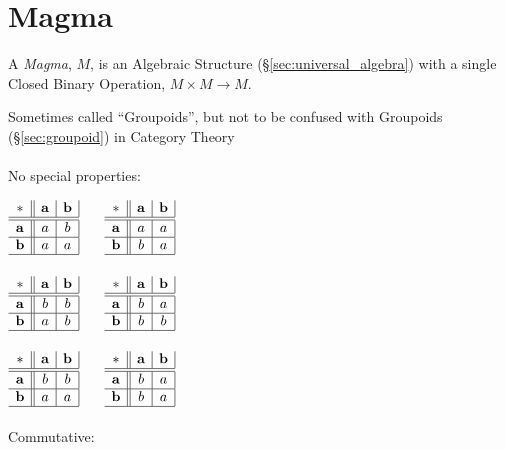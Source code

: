 \section{Magma}\label{sec:magma}

A \emph{Magma}, $M$, is an Algebraic Structure
(\S\ref{sec:universal_algebra}) with a single Closed Binary Operation,
$M \times M \rightarrow M$.

\fist Sometimes called ``Groupoids'', but not to be confused with Groupoids
(\S\ref{sec:groupoid}) in Category Theory
\\ \\
No special properties:

$\begin{array}{c||c|c|}
  * & \mathbf{a} & \mathbf{b} \\ \hline \hline
  \mathbf{a} & a & b \\ \hline
  \mathbf{b} & a & a \\ \hline
\end{array}$ $\quad$ $\begin{array}{c||c|c|}
  * & \mathbf{a} & \mathbf{b} \\ \hline \hline
  \mathbf{a} & a & a \\ \hline
  \mathbf{b} & b & a \\ \hline
\end{array}$ \\ \hfill \\

$\begin{array}{c||c|c|}
  * & \mathbf{a} & \mathbf{b} \\ \hline \hline
  \mathbf{a} & b & b \\ \hline
  \mathbf{b} & a & b \\ \hline
\end{array}$ $\quad$ $\begin{array}{c||c|c|}
  * & \mathbf{a} & \mathbf{b} \\ \hline \hline
  \mathbf{a} & b & a \\ \hline
  \mathbf{b} & b & b \\ \hline
\end{array}$ \\ \hfill \\

$\begin{array}{c||c|c|}
  * & \mathbf{a} & \mathbf{b} \\ \hline \hline
  \mathbf{a} & b & b \\ \hline
  \mathbf{b} & a & a \\ \hline
\end{array}$ $\quad$ $\begin{array}{c||c|c|}
  * & \mathbf{a} & \mathbf{b} \\ \hline \hline
  \mathbf{a} & b & a \\ \hline
  \mathbf{b} & b & a \\ \hline
\end{array}$
\\ \\
Commutative:

